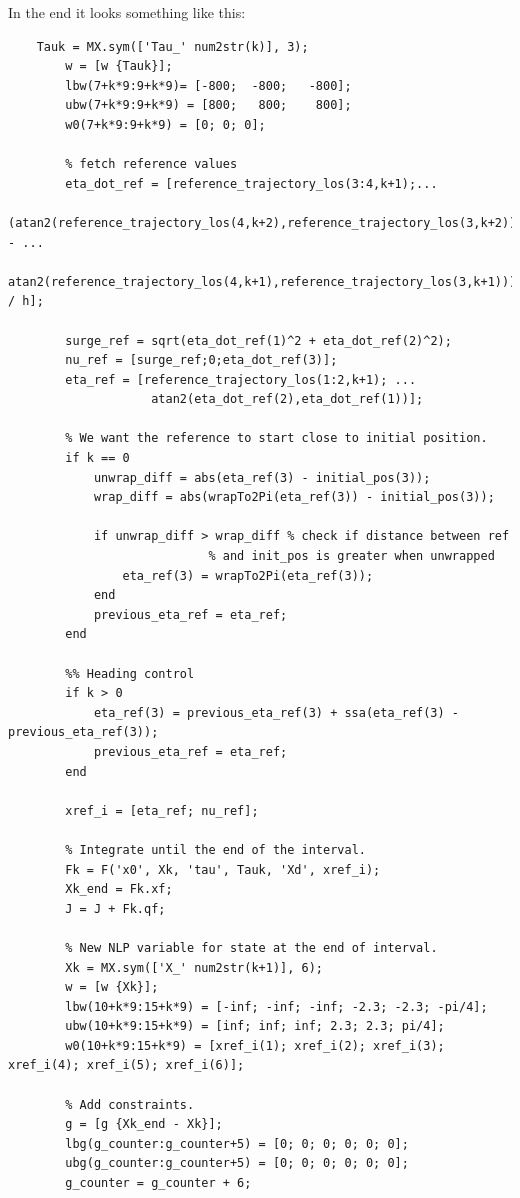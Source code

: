 In the end it looks something like this:
\begin{lstlisting}
    Tauk = MX.sym(['Tau_' num2str(k)], 3);
        w = [w {Tauk}];
        lbw(7+k*9:9+k*9)= [-800;  -800;   -800];
        ubw(7+k*9:9+k*9) = [800;   800;    800];
        w0(7+k*9:9+k*9) = [0; 0; 0];
        
        % fetch reference values
        eta_dot_ref = [reference_trajectory_los(3:4,k+1);...
                  (atan2(reference_trajectory_los(4,k+2),reference_trajectory_los(3,k+2)) - ...
                   atan2(reference_trajectory_los(4,k+1),reference_trajectory_los(3,k+1))) / h];
        
        surge_ref = sqrt(eta_dot_ref(1)^2 + eta_dot_ref(2)^2);
        nu_ref = [surge_ref;0;eta_dot_ref(3)];     
        eta_ref = [reference_trajectory_los(1:2,k+1); ...
                    atan2(eta_dot_ref(2),eta_dot_ref(1))]; 

        % We want the reference to start close to initial position.
        if k == 0
            unwrap_diff = abs(eta_ref(3) - initial_pos(3));
            wrap_diff = abs(wrapTo2Pi(eta_ref(3)) - initial_pos(3));

            if unwrap_diff > wrap_diff % check if distance between ref 
                            % and init_pos is greater when unwrapped
                eta_ref(3) = wrapTo2Pi(eta_ref(3));
            end
            previous_eta_ref = eta_ref;
        end
        
        %% Heading control
        if k > 0
            eta_ref(3) = previous_eta_ref(3) + ssa(eta_ref(3) - previous_eta_ref(3));
            previous_eta_ref = eta_ref; 
        end            

        xref_i = [eta_ref; nu_ref];
        
        % Integrate until the end of the interval.
        Fk = F('x0', Xk, 'tau', Tauk, 'Xd', xref_i);
        Xk_end = Fk.xf;
        J = J + Fk.qf;
        
        % New NLP variable for state at the end of interval.
        Xk = MX.sym(['X_' num2str(k+1)], 6);
        w = [w {Xk}];
        lbw(10+k*9:15+k*9) = [-inf; -inf; -inf; -2.3; -2.3; -pi/4];
        ubw(10+k*9:15+k*9) = [inf; inf; inf; 2.3; 2.3; pi/4];
        w0(10+k*9:15+k*9) = [xref_i(1); xref_i(2); xref_i(3); xref_i(4); xref_i(5); xref_i(6)];
        
        % Add constraints.
        g = [g {Xk_end - Xk}];
        lbg(g_counter:g_counter+5) = [0; 0; 0; 0; 0; 0];
        ubg(g_counter:g_counter+5) = [0; 0; 0; 0; 0; 0];
        g_counter = g_counter + 6;
\end{lstlisting}

